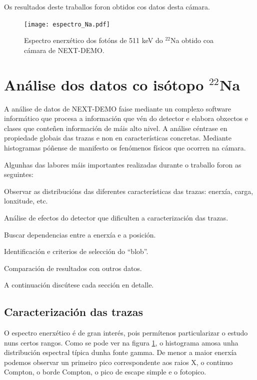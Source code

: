 \documentclass[a4paper,12pt]{article}
\begin{document}
Os resultados deste traballos foron obtidos cos datos desta cámara. 

\begin{figure}[!]
\centering
\texttt{[image: espectro\_Na.pdf]}
\caption{Espectro enerxético dos fotóns de 511 keV do $^{22}$Na obtido coa cámara de NEXT-DEMO.}
\label{Espectro}
\end{figure}

\section{Análise dos datos co isótopo $^{22}$Na}\label{analise}

A análise de datos de NEXT-DEMO faise mediante un complexo software informático que procesa a información que vén do detector e elabora obxectos e clases que conteñen información de máis alto nivel. A análise céntrase en propiedade globais das trazas e non en características concretas. Mediante histogramas póñense de manifesto os fenómenos físicos que ocorren na cámara.

Algunhas das labores máis importantes realizadas durante o traballo foron as seguintes:

\bi
\item Observar as distribucións das diferentes características das trazas: enerxía, carga, lonxitude, etc.
\item Análise de efectos do detector que dificulten a caracterización das trazas.
\item Buscar dependencias entre a enerxía e a posición.
\item Identificación e criterios de selección do ``blob''.
\item Comparación de resultados con outros datos.
\ei

A continuación discútese cada sección en detalle.

\subsection{Caracterización das trazas}


O espectro enerxético é de gran interés, pois permítenos particularizar o estudo nuns certos rangos. Como se pode ver na figura \ref{Espectro}, o histograma amosa unha distribución espectral típica dunha fonte gamma. De menor a maior enerxía podemos observar un primeiro pico correspondente aos raios X, o continuo Compton, o borde Compton, o pico de escape simple e o fotopico. %
\end{document}
